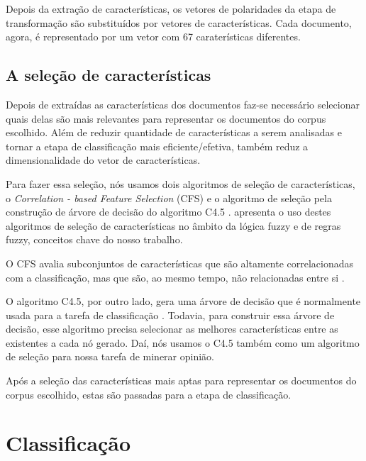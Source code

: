 Depois da extração de características, os vetores de polaridades da etapa de transformação são substituídos por vetores de características. Cada documento, agora, é representado por um vetor com 67 caraterísticas diferentes. 

\subsection{A seleção de características}

Depois de extraídas as características dos documentos faz-se necessário selecionar quais delas são mais relevantes para representar os documentos do corpus escolhido. Além de reduzir quantidade de características a serem analisadas e tornar a etapa de classificação mais eficiente/efetiva, também reduz a dimensionalidade do vetor de características. 

Para fazer essa seleção, nós usamos dois algoritmos de seleção de características, o \textit{Correlation - based Feature Selection} (CFS) e o algoritmo de seleção pela construção de árvore de decisão do algoritmo C4.5 \cite{cintra2008fuzzy}.  apresenta o uso destes algoritmos de seleção de características no âmbito da lógica fuzzy e de regras fuzzy, conceitos chave do nosso trabalho. 

O CFS avalia subconjuntos de características que são altamente correlacionadas com a classificação, mas que são, ao mesmo tempo, não relacionadas entre si \cite{hall1999correlation}.  

O algoritmo C4.5, por outro lado, gera uma árvore de decisão que é normalmente usada para a tarefa de classificação \cite{quinlan19934}. Todavia, para construir essa árvore de decisão, esse algoritmo precisa selecionar as melhores características entre as existentes a cada nó gerado. Daí, nós usamos o C4.5 também como um algoritmo de seleção para nossa tarefa de minerar opinião. 

Após a seleção das características mais aptas para representar os documentos do corpus escolhido, estas são passadas para a etapa de classificação. 

\section{Classificação}

